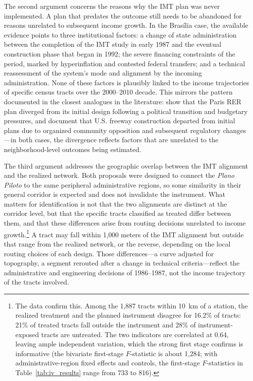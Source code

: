 The second argument concerns the reasons why the IMT plan was never implemented. A plan that predates the outcome still needs to be abandoned for reasons unrelated to subsequent income growth. In the Brasília case, the available evidence points to three institutional factors: a change of state administration between the completion of the IMT study in early 1987 and the eventual construction phase that began in 1992; the severe financing constraints of the period, marked by hyperinflation and contested federal transfers; and a technical reassessment of the system's mode and alignment by the incoming administration. None of these factors is plausibly linked to the income trajectories of specific census tracts over the 2000--2010 decade. This mirrors the pattern documented in the closest analogues in the literature: \cite{mayertrevien2017largescale} show that the Paris RER plan diverged from its initial design following a political transition and budgetary pressures, and \cite{brinkman2024freeway} document that U.S. freeway construction departed from initial plans due to organized community opposition and subsequent regulatory changes---in both cases, the divergence reflects factors that are unrelated to the neighborhood-level outcomes being estimated.

The third argument addresses the geographic overlap between the IMT alignment and the realized network. Both proposals were designed to connect the \textit{Plano Piloto} to the same peripheral administrative regions, so some similarity in their general corridor is expected and does not invalidate the instrument. What matters for identification is not that the two alignments are distinct at the corridor level, but that the specific tracts classified as treated differ between them, and that these differences arise from routing decisions unrelated to income growth.\footnote{The data confirm this. Among the 1,887 tracts within 10~km of a station, the realized treatment and the planned instrument disagree for 16.2\% of tracts: 21\% of treated tracts fall outside the instrument and 28\% of instrument-exposed tracts are untreated. The two indicators are correlated at 0.64, leaving ample independent variation, which the strong first stage confirms is informative (the bivariate first-stage $F$-statistic is about 1{,}284; with administrative-region fixed effects and controls, the first-stage $F$-statistics in Table~\ref{tab:iv_results} range from 733 to 816).} A tract may fall within 1,000 meters of the IMT alignment but outside that range from the realized network, or the reverse, depending on the local routing choices of each design. Those differences---a curve adjusted for topography, a segment rerouted after a change in technical criteria---reflect the administrative and engineering decisions of 1986--1987, not the income trajectory of the tracts involved.

